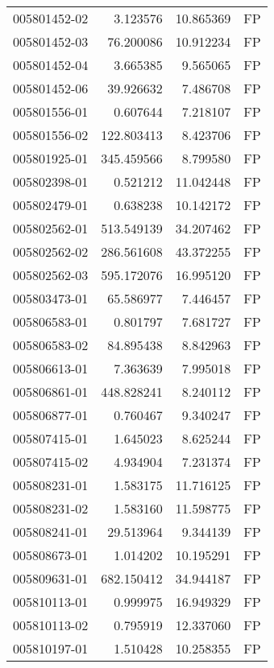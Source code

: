 \begin{tabular}{lrrl}
005801452-02 &    3.123576 &      10.865369 &   FP \\
005801452-03 &   76.200086 &      10.912234 &   FP \\
005801452-04 &    3.665385 &       9.565065 &   FP \\
005801452-06 &   39.926632 &       7.486708 &   FP \\
005801556-01 &    0.607644 &       7.218107 &   FP \\
005801556-02 &  122.803413 &       8.423706 &   FP \\
005801925-01 &  345.459566 &       8.799580 &   FP \\
005802398-01 &    0.521212 &      11.042448 &   FP \\
005802479-01 &    0.638238 &      10.142172 &   FP \\
005802562-01 &  513.549139 &      34.207462 &   FP \\
005802562-02 &  286.561608 &      43.372255 &   FP \\
005802562-03 &  595.172076 &      16.995120 &   FP \\
005803473-01 &   65.586977 &       7.446457 &   FP \\
005806583-01 &    0.801797 &       7.681727 &   FP \\
005806583-02 &   84.895438 &       8.842963 &   FP \\
005806613-01 &    7.363639 &       7.995018 &   FP \\
005806861-01 &  448.828241 &       8.240112 &   FP \\
005806877-01 &    0.760467 &       9.340247 &   FP \\
005807415-01 &    1.645023 &       8.625244 &   FP \\
005807415-02 &    4.934904 &       7.231374 &   FP \\
005808231-01 &    1.583175 &      11.716125 &   FP \\
005808231-02 &    1.583160 &      11.598775 &   FP \\
005808241-01 &   29.513964 &       9.344139 &   FP \\
005808673-01 &    1.014202 &      10.195291 &   FP \\
005809631-01 &  682.150412 &      34.944187 &   FP \\
005810113-01 &    0.999975 &      16.949329 &   FP \\
005810113-02 &    0.795919 &      12.337060 &   FP \\
005810197-01 &    1.510428 &      10.258355 &   FP \\

\end{tabular}
